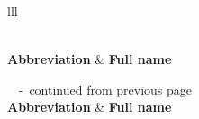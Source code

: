 \documentclass{bmcart}
\begin{document}
\begin{center}
\begin{longtable}{lll}
\caption{Explanation of the abbreviated names referring to molecular species
in the main text.}\label{suppl-tab:names} \\
\hline
\noalign{\vskip 2mm} {\bfseries Abbreviation} & {\bfseries Full name} \\[2mm]
\hline
\endfirsthead

%
{\scriptsize{\bfseries \tablename\ \thetable{}} \--\ continued from previous page} \\
\hline
\noalign{\vskip 2mm} {\bfseries Abbreviation} & {\bfseries Full name} \\[2mm]
\hline
\endhead

\hline {} \\ %
\endfoot

\hline
\endlastfoot


\end{longtable}
\end{center}
\end{document}
